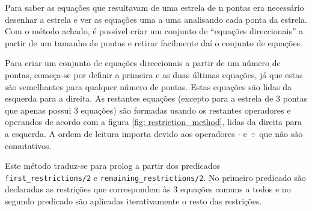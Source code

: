 Para saber as equações que resultavam de uma estrela de n pontas era necessário desenhar a estrela e ver as equações uma a uma analisando cada ponta da estrela. Com o método achado, é possível criar um conjunto de \enquote{equações direccionais} a partir de um tamanho de pontas e retirar facilmente daí o conjunto de equações.

Para criar um conjunto de equações direccionais a partir de um número de pontas, começa-se por definir a primeira e as duas últimas equações, já que estas são semelhantes para qualquer número de pontas. Estas equações são lidas da esquerda para a direita. As restantes equações (excepto para a estrela de 3 pontas que apenas possui 3 equações) são formadas usando os restantes operadores e operandos de acordo com a figura \ref{fig: restriction_method}, lidas da direita para a esquerda. A ordem de leitura importa devido aos operadores - e ÷ que não são comutativos.

Este método traduz-se para prolog a partir dos predicados \verb^first_restrictions/2^ e \verb#remaining_restrictions/2#. No primeiro predicado são declaradas as restrições que correspondem às 3 equações comuns a todos e no segundo predicado são aplicadas iterativamente o resto das restrições.
